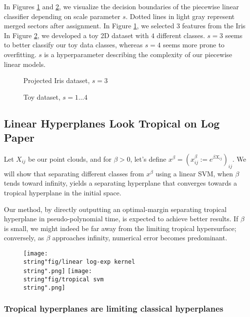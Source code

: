 \documentclass[oneside,english,a4paper]{amsart}
\numberwithin{equation}{section}
\numberwithin{figure}{section}
\theoremstyle{plain}
\theoremstyle{definition}
\theoremstyle{plain}
\theoremstyle{remark}
\theoremstyle{plain}
\theoremstyle{definition}
\theoremstyle{definition}
\begin{document}
In Figures \ref{fig:iris} and \ref{fig:toy}, we visualize the decision boundaries of the piecewise linear classifier depending on scale parameter $s$. Dotted lines in light gray represent merged sectors after assignment. In Figure \ref{fig:iris}, we selected $3$ features from the Iris In Figure \ref{fig:toy}, we developed a toy 2D dataset with $4$ different classes. $s=3$ seems to better classify our toy data classes, whereas $s=4$ seems more prone to overfitting. $s$ is a hyperparameter describing the complexity of our piecewise linear models.

\begin{figure}[!h]
    \centering
    \resizebox{0.7\textwidth}{!}{}
    \caption{Projected Iris dataset, $s=3$}
    \label{fig:iris}
\end{figure}

\begin{figure}[!h]
    \centering
    \resizebox{\textwidth}{!}{}
    \caption{Toy dataset, $s = 1\ldots 4$}
    \label{fig:toy}
\end{figure}

\newpage
\subsection{Linear Hyperplanes Look Tropical on Log Paper}

Let $X_{ij}$ be our point clouds, and for $\beta>0$, let's define
$x^{\beta}=(x_{ij}^{\beta}:=e^{\beta X_{ij}})_{ij}$. We will show
that separating different classes from $x^{\beta}$ using a linear
SVM, when $\beta$ tends toward infinity, yields a separating hyperplane
that converges towards a tropical hyperplane in the initial space.

Our method, by directly outputting an optimal-margin separating tropical
hyperplane in pseudo-polynomial time, is expected to achieve better
results. If $\beta$ is small, we might indeed be far away from the
limiting tropical hypersurface; conversely, as $\beta$ approaches
infinity, numerical error becomes predominant.

\begin{figure}[h]
\centering \texttt{[image: \\string"fig/linear log-exp kernel\\string".png]}
\texttt{[image: \\string"fig/tropical svm\\string".png]} 
\end{figure}


\subsubsection{Tropical hyperplanes are limiting classical hyperplanes}
\end{document}
